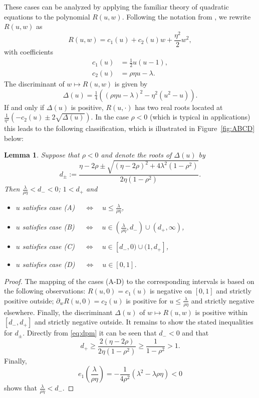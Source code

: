 \documentclass[12pt,a4paper]{amsart}
\numberwithin{equation}{section}
\numberwithin{equation}{section}
\newtheorem{lemma}[theorem]{Lemma}
\theoremstyle{nonumberplain}
\begin{document}
These cases can be analyzed by applying the familiar theory of quadratic equations to the polynomial $R(u,w)$. Following the notation from \cite{gerhold2018moment}, we rewrite $R(u,w)$ as
\begin{equation}\label{eq:R}
	R(u,w) = c_1(u) + c_2(u) w + \frac{\eta^2}{2} w^2,
\end{equation}
with coefficients
\begin{align*}
	c_1(u) &= \tfrac{1}{2}u(u-1), \\
	c_2(u) &= \rho \eta u - \lambda. 
\end{align*}
The discriminant of $w \mapsto R(u,w)$ is given by 
\begin{equation}\label{eq:discriminant}
	\Delta(u)  = \tfrac{1}{4} \left((\rho \eta u - \lambda)^2 - \eta^2 (u^2 - u)\right).
\end{equation}
If and only if $\Delta(u)$ is positive, $R(u,\cdot)$ has two real roots located at $\frac{1}{\eta^2}(-c_2(u) \pm 2\sqrt{\Delta(u)})$. In the case $\rho < 0$ (which is typical in applications) this leads to the following classification, which is illustrated in Figure~\ref{fig:ABCD} below:
\begin{lemma}\label{lem:caseABCD}
Suppose that $\rho < 0$ and denote the roots of $\Delta(u)$ by
\begin{equation}\label{eq:dpm}
d_\pm := \frac{\eta - 2\rho \pm \sqrt{(\eta - 2\rho)^2 + 4\lambda^2(1-\rho^2)}}{2 \eta (1 - \rho^2)}.
\end{equation}
Then $\tfrac{\lambda}{\rho \eta} < d_- < 0$; $1 < d_+$ and 
\begin{itemize}
\item $u$ satisfies case (A)  $\quad \Longleftrightarrow \quad u \le \frac{\lambda}{\rho \eta}$,
\item $u$ satisfies case (B) $\quad \Longleftrightarrow \quad u \in (\frac{\lambda}{\rho \eta},d_-) \cup (d_+,\infty)$,
\item $u$ satisfies case (C)  $\quad \Longleftrightarrow \quad u \in [d_-,0) \cup (1,d_+]$,
\item $u$ satisfies case (D)  $\quad \Longleftrightarrow \quad u \in [0,1]$.
\end{itemize}
\end{lemma}
\begin{proof}The mapping of the cases (A-D) to the corresponding intervals is based on the following observations: $R(u,0) = c_1(u)$ is negative on $[0,1]$ and strictly positive outside; $\partial_w R(u,0) = c_2(u)$ is positive for $u \le  \tfrac{\lambda}{\rho \eta}$ and strictly negative elsewhere. Finally, the discriminant $\Delta(u)$ of $w \mapsto R(u,w)$ is positive within $[d_-,d_+]$ and strictly negative outside. It remains to show the stated inequalities for $d_\pm$. Directly from \eqref{eq:dpm} it can be seen that $d_- < 0$ and that 
\[d_+ \ge \frac{2(\eta - 2\rho)}{2\eta(1 - \rho^2)} \ge \frac{1}{1 - \rho^2} > 1.\]
Finally, 
\[e_1\left(\frac{\lambda}{\rho \eta}\right) = - \frac{1}{4\rho^2} (\lambda^2 - \lambda \rho \eta) < 0\]
shows that $\tfrac{\lambda}{\rho \eta} < d_-$.
\end{proof}
\end{document}

